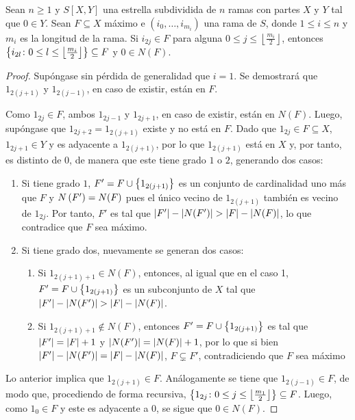 \begin{lema}
\label{lem:rama-en-F}
    Sean $n\geq 1$ y $S[X,Y]$ una estrella subdividida de $n$ ramas con partes
    $X$ y $Y$ tal que $0\in Y$. Sean $F\subseteq X$ m\'aximo e $(i_{0}, \dots,
    i_{m_i})$ una rama de $S$, donde $1\leq i\leq n$ y $m_i$ es la longitud de
    la rama. Si $i_{2j}\in F$ para alguna $0\leq j \leq
    \left\lfloor\frac{m_i}{2}\right\rfloor$, entonces $\left\{ i_{2l} \colon 0\leq l
    \leq \left\lfloor\frac{m_i}{2}\right\rfloor\right\} \subseteq F$ y $0\in N(F)$.
\end{lema}

\begin{proof}
    Sup\'ongase sin p\'erdida de generalidad que $i=1$. Se demostrar\'a que
    $1_{2(j+1)}$ y $1_{2(j-1)}$, en caso de existir, est\'an en $F$.

    Como $1_{2j}\in F$, ambos $1_{2j-1}$ y $1_{2j+1}$, en caso de existir,
    est\'an en $N(F)$. Luego, sup\'ongase que $1_{2j+2} = 1_{2(j+1)}$ existe y
    no est\'a en $F$. Dado que $1_{2j}\in F\subseteq X$, $1_{2j+1}\in Y$ y es
    adyacente a $1_{2(j+1)}$, por lo que $1_{2(j+1)}$ est\'a en $X$ y, por
    tanto, es distinto de $0$, de manera que este tiene grado $1$ o $2$,
    generando dos casos:

    \begin{enumerate}
        \item Si tiene grado $1$, $F'=F\cup \left\{ 1_{2(j+1)}\right\}$ es un conjunto de
        cardinalidad uno m\'as que $F$ y $N\left( F'\right) = N(F)$ pues el \'unico
        vecino de $1_{2(j+1)}$ tambi\'en es vecino de $1_{2j}$. Por tanto, $F'$
        es tal que $\left|F'\right|-\left|N(F')\right| > \left|F\right|-\left|N(F)\right|$, lo que
        contradice que $F$ sea m\'aximo.

        \item Si tiene grado dos, nuevamente se generan dos casos: 
              \begin{enumerate}
                \item Si $1_{2(j+1)+1}\in N(F)$, entonces, al igual que en el
                caso 1, $F'=F\cup \left\{ 1_{2(j+1)}\right\}$ es un subconjunto de $X$ tal
                que $\left|F'\right|-\left|N(F')\right| > \left|F\right|-\left|N(F)\right|$.

                \item Si $1_{2(j+1)+1}\notin N(F)$, entonces $F'=F\cup
                \left\{ 1_{2(j+1)}\right\}$ es tal que $\left|F'\right| = \left|F\right|+1$ y $\left|N(F')\right|
                = \left|N(F)\right| + 1$, por lo que si bien $\left|F'\right|-\left|N(F')\right| =
                \left|F\right|-\left|N(F)\right|$, $F\subsetneq F'$, contradiciendo que $F$
                sea m\'aximo
              \end{enumerate}
    \end{enumerate}

    Lo anterior implica que $1_{2(j+1)} \in F$. An\'alogamente se tiene que
    $1_{2(j-1)}\in F$, de modo que, procediendo de forma recursiva, $\left\{ 1_{2j}
    \colon 0\leq j \leq \left\lfloor\frac{m_1}{2}\right\rfloor\right\} \subseteq F$.
    Luego, como $1_0\in F$ y este es adyacente a $0$, se sigue que $0\in N(F)$.

\end{proof}

